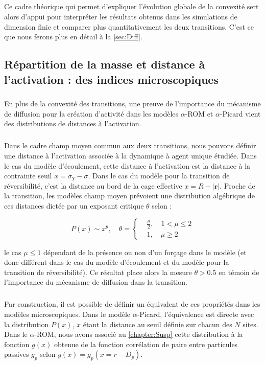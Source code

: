 \subparagraph{}Ce cadre théorique qui permet d'expliquer l'évolution globale de la convexité sert alors d'appui pour interpréter les résultats obtenus dans les simulations de dimension finie et comparer plus quantitativement les deux transitions. C'est ce que nous ferons plus en détail à la \autoref{sec:Diff}.

\subsection{Répartition de la masse et distance à l'activation : des indices microscopiques}

\subparagraph{}En plus de la convexité des transitions, une preuve de l'importance du mécanisme de diffusion pour la création d'activité dans les modèles $\alpha$-ROM et $\alpha$-Picard vient des distributions de distances à l'activation.

\subparagraph{}Dans le cadre champ moyen commun aux deux transitions, nous pouvons définir une distance à l'activation associée à la dynamique à agent unique étudiée. Dans le cas du modèle d'écoulement, cette distance à l'activation est la distance à la contrainte seuil $x = \sigma_Y - \sigma$. Dans le cas du modèle pour la transition de réversibilité, c'est la distance au bord de la cage effective $x = R-|\mathbf{r}|$. Proche de la transition, les modèles champ moyen prévoient une distribution algébrique de ces distances dictée par un exposant critique $\theta$ selon :

\begin{equation}
	P(x) \sim x^\theta, \quad \theta = \left\{
	\begin{aligned}
	&\frac{\mu}{2}, \quad 1 < \mu \leq 2\\
	&1, \quad \mu \geq 2
	\end{aligned}
	\right.
\end{equation}

\noindent le cas $\mu \leq 1$ dépendant de la présence ou non d'un forçage dans le modèle \cite{lin_mean-field_2016} (et donc différent dans le cas du modèle d'écoulement et du modèle pour la transition de réversibilité). Ce résultat place alors la mesure $\theta > 0.5$ en témoin de l'importance du mécanisme de diffusion dans la transition.

\subparagraph{}Par construction, il est possible de définir un équivalent de ces propriétés dans les modèles microscopiques. Dans le modèle $\alpha$-Picard, l'équivalence est directe avec la distribution $P(x)$, $x$ étant la distance au seuil définie sur chacun des $N$ sites. Dans le $\alpha$-ROM, nous avons associé au \autoref{chapter:Susp} cette distribution à la fonction $g(x)$ obtenue de la fonction corrélation de paire entre particules passives $g_p$ selon $g(x) = g_p(x = r - D_p)$.

